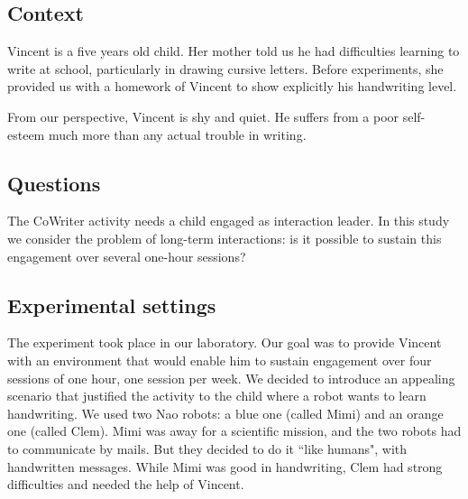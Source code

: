 \documentclass{sig-alternate}
\begin{document}
\subsection{Context}
Vincent is a five years old child. Her mother told us he had difficulties learning
to write at school, particularly in drawing cursive letters. Before experiments,
she provided us with a homework of Vincent to show explicitly his handwriting
level. 

From our perspective, Vincent is shy and quiet. He suffers from a poor
self-esteem much more than any actual trouble in writing.

\subsection{Questions}

The CoWriter activity needs a child engaged as interaction leader. 
In this study we consider the problem of long-term interactions: is it possible to
sustain this engagement over several one-hour sessions?

%

\subsection{Experimental settings}

The experiment took place in our laboratory. Our goal was to provide Vincent with
an environment that would enable him to sustain engagement over four sessions 
of one hour, one session per week. We decided 
to introduce an appealing scenario that justified the activity to the child
where a robot wants to learn handwriting. We used two Nao robots: a blue one 
(called Mimi) and an orange one (called Clem). Mimi was away for a 
scientific mission, and the two robots had to communicate by mails. But they decided to do it 
``like humans", with handwritten messages. While Mimi was good in handwriting, 
Clem had strong difficulties and needed the help of Vincent.
\end{document}
